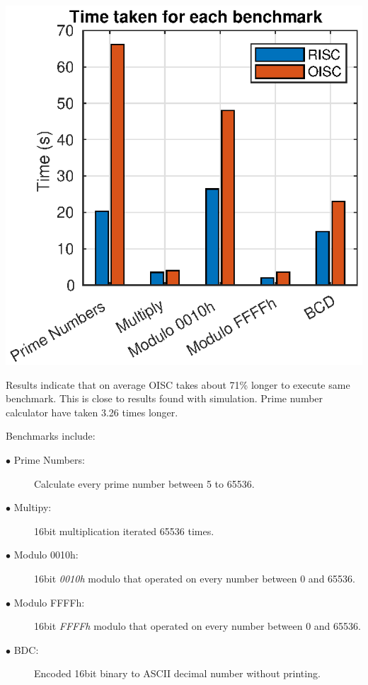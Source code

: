 \begin{colfigure}
	\centering
	\includegraphics[width=\linewidth]{../tests/timing.eps}
	\label{fig:timing}
\end{colfigure}

Results indicate that on average OISC takes about 71\% longer to execute same benchmark. This is close to results found with simulation. Prime number calculator have taken 3.26 times longer.

Benchmarks include:
\begin{description}
	\item[$\bullet$ Prime Numbers:] Calculate every prime number between 5 to 65536.  
	\item[$\bullet$ Multipy:] 16bit multiplication iterated 65536 times.
	\item[$\bullet$ Modulo 0010h:] 16bit \textit{0010h} modulo that operated on every number between 0 and 65536.
	\item[$\bullet$ Modulo FFFFh:] 16bit \textit{FFFFh} modulo that operated on every number between 0 and 65536.
	\item[$\bullet$ BDC:] Encoded 16bit binary to ASCII decimal number without printing.
\end{description}


